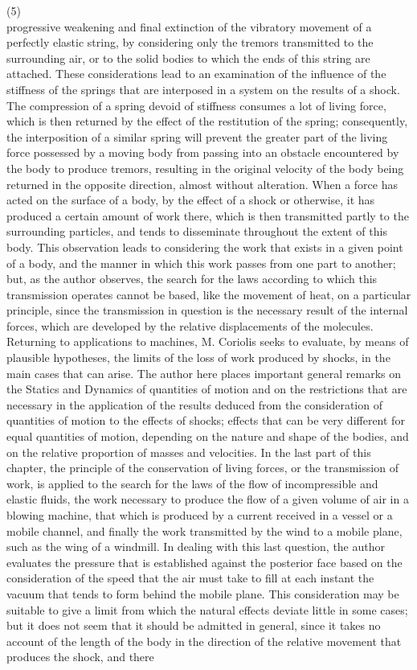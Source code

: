 \documentclass{book}
\begin{document}
\newpage
(5)\\
progressive weakening and final extinction of the vibratory movement of a perfectly elastic string, by considering only the tremors transmitted to the surrounding air, or to the solid bodies to which the ends of this string are attached.
These considerations lead to an examination of the influence of the stiffness of the springs that are interposed in a system on the results of a shock. The compression of a spring devoid of stiffness consumes a lot of living force, which is then returned by the effect of the restitution of the spring; consequently, the interposition of a similar spring will prevent the greater part of the living force possessed by a moving body from passing into an obstacle encountered by the body to produce tremors, resulting in the original velocity of the body being returned in the opposite direction, almost without alteration. When a force has acted on the surface of a body, by the effect of a shock or otherwise, it has produced a certain amount of work there, which is then transmitted partly to the surrounding particles, and tends to disseminate throughout the extent of this body. This observation leads to considering the work that exists in a given point of a body, and the manner in which this work passes from one part to another; but, as the author observes, the search for the laws according to which this transmission operates cannot be based, like the movement of heat, on a particular principle, since the transmission in question is the necessary result of the internal forces, which are developed by the relative displacements of the molecules. Returning to applications to machines, M. Coriolis seeks to evaluate, by means of plausible hypotheses, the limits of the loss of work produced by shocks, in the main cases that can arise. The author here places important general remarks on the Statics and Dynamics of quantities of motion and on the restrictions that are necessary in the application of the results deduced from the consideration of quantities of motion to the effects of shocks; effects that can be very different for equal quantities of motion, depending on the nature and shape of the bodies, and on the relative proportion of masses and velocities. In the last part of this chapter, the principle of the conservation of living forces, or the transmission of work, is applied to the search for the laws of the flow of incompressible and elastic fluids, the work necessary to produce the flow of a given volume of air in a blowing machine, that which is produced by a current received in a vessel or a mobile channel, and finally the work transmitted by the wind to a mobile plane, such as the wing of a windmill. In dealing with this last question, the author evaluates the pressure that is established against the posterior face based on the consideration of the speed that the air must take to fill at each instant the vacuum that tends to form behind the mobile plane. This consideration may be suitable to give a limit from which the natural effects deviate little in some cases; but it does not seem that it should be admitted in general, since it takes no account of the length of the body in the direction of the relative movement that produces the shock, and there 
\end{document}
